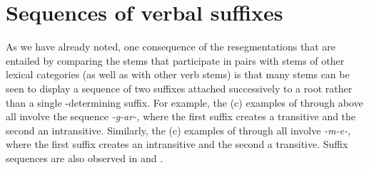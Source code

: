 \documentclass[output=paper,
modfonts
]{LSP/langsci}
\begin{document}
\section{Sequences of verbal suffixes}\label{sequences}\label{sec:dechene:3}

As we have already noted, one consequence of the resegmentations that
are entailed by comparing the stems that participate in 
pairs with stems of other lexical categories (as well as with other verb
stems) is that many stems can be seen to display a sequence of two
suffixes attached successively to a root rather than a single
-determining suffix. For example, the (c) examples of 
through  above all involve the sequence \textit{-g-ar-,} where the
first suffix creates a transitive  and the second an intransitive.
Similarly, the (c) examples of  through  all involve
\textit{-m-e-,} where the first suffix creates an intransitive  and
the second a transitive. Suffix sequences are also observed in  and
.
\end{document}
